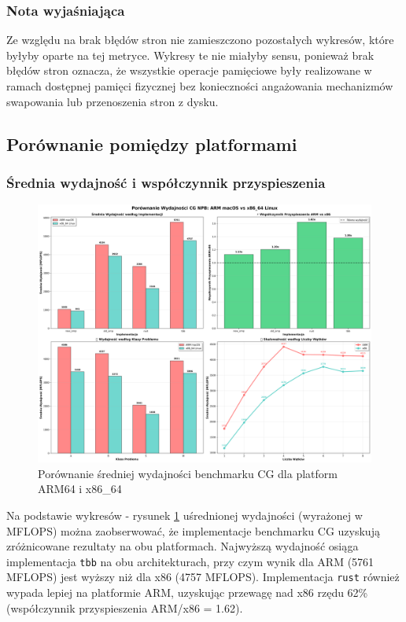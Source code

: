 \subsubsection{Nota wyjaśniająca}
Ze względu na brak błędów stron nie zamieszczono pozostałych wykresów, które byłyby oparte na tej metryce. Wykresy te nie miałyby sensu, ponieważ brak błędów stron oznacza, że wszystkie operacje pamięciowe były realizowane w ramach dostępnej pamięci fizycznej bez konieczności angażowania mechanizmów swapowania lub przenoszenia stron z dysku.

\subsection{Porównanie pomiędzy platformami}
\subsubsection{Średnia wydajność i współczynnik przyspieszenia}
\begin{figure}[H]
    \centering
    \includegraphics[width=\textwidth]{analiza/images/parallel/cg/compare/cg_porownanie_platform_arm_vs_x86.png}
    \caption{Porównanie średniej wydajności benchmarku CG dla platform ARM64 i x86\_64}
    \label{cg_porownanie_platform_arm_vs_x86}
\end{figure}
Na podstawie wykresów - rysunek \ref{cg_porownanie_platform_arm_vs_x86} uśrednionej wydajności (wyrażonej w MFLOPS) można zaobserwować, że implementacje benchmarku CG uzyskują zróżnicowane rezultaty na obu platformach. Najwyższą wydajność osiąga implementacja \texttt{tbb} na obu architekturach, przy czym wynik dla ARM (5761 MFLOPS) jest wyższy niż dla x86 (4757 MFLOPS). Implementacja \texttt{rust} również wypada lepiej na platformie ARM, uzyskując przewagę nad x86 rzędu 62\% (współczynnik przyspieszenia ARM/x86 = 1.62).

